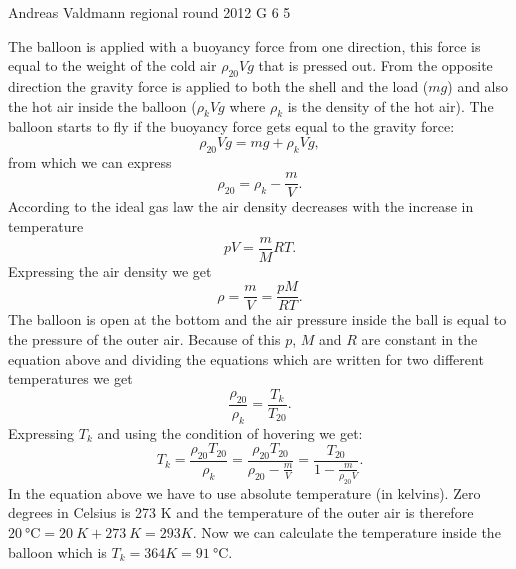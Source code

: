 \documentclass[11pt]{article}
\begin{document}
{Andreas Valdmann} %
{regional round} %
{2012} %
{G 6} %
{5} %
{

\ifEngSolution
The balloon is applied with a buoyancy force from one direction, this force is equal to the weight of the cold air $\rho_{20} V g$ that is pressed out. From the opposite direction the gravity force is applied to both the shell and the load ($mg$) and also the hot air inside the balloon ($\rho_k V g$ where $\rho_k$ is the density of the hot air). The balloon starts to fly if the buoyancy force gets equal to the gravity force:
\[ \rho_{20} V g=mg+\rho_k V g,\] 
from which we can express
\[ \rho_{20}=\rho_k-\frac{m}{V}.\] 
According to the ideal gas law the air density decreases with the increase in temperature 
\[ pV=\frac{m}{M}RT. \] 
Expressing the air density we get
\[ \rho=\frac{m}{V}=\frac{pM}{RT}.\] 
The balloon is open at the bottom and the air pressure inside the ball is equal to the pressure of the outer air. Because of this $p$, $M$ and $R$ are constant in the equation above and dividing the equations which are written for two different temperatures we get
\[ \frac{\rho_{20}}{\rho_k}=\frac{T_k}{T_{20}}.\] 
Expressing $T_k$ and using the condition of hovering we get:
\[ T_k=\frac{\rho_{20} T_{20}}{\rho_k}=\frac{\rho_{20} 
T_{20}}{\rho_{20}-\frac{m}{V}}=\frac{T_{20}}{1-\frac{m}{\rho_{20}V}}.\] 
In the equation above we have to use absolute temperature (in kelvins). Zero degrees in Celsius is 273 K and the temperature of the outer air is therefore $\SI{20}{\celsius}=\SI{20}{K} + \SI{273}{K}=\SI{293}K$. Now we can calculate the temperature inside the balloon which is $T_k=\SI{364}K=\SI{91}\celsius$.
\fi
}
\end{document}
